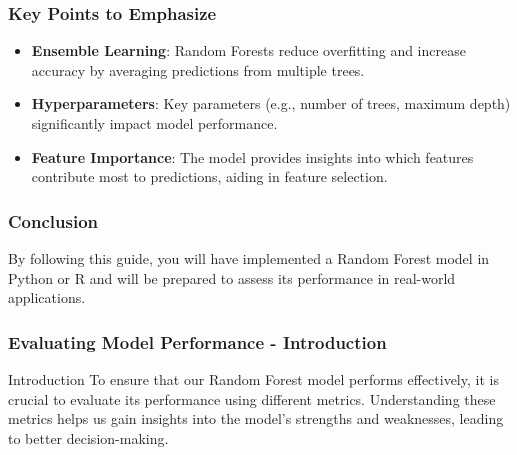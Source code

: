 \documentclass[aspectratio=169]{beamer}
\begin{document}
\begin{frame}
    \frametitle{Key Points to Emphasize}
    \begin{itemize}
        \item \textbf{Ensemble Learning}: Random Forests reduce overfitting and increase accuracy by averaging predictions from multiple trees.
        \item \textbf{Hyperparameters}: Key parameters (e.g., number of trees, maximum depth) significantly impact model performance.
        \item \textbf{Feature Importance}: The model provides insights into which features contribute most to predictions, aiding in feature selection.
    \end{itemize}
\end{frame}

\begin{frame}
    \frametitle{Conclusion}
    By following this guide, you will have implemented a Random Forest model in Python or R and will be prepared to assess its performance in real-world applications.
\end{frame}

\begin{frame}[fragile]
    \frametitle{Evaluating Model Performance - Introduction}
    \begin{block}{Introduction}
        To ensure that our Random Forest model performs effectively, it is crucial to evaluate its performance using different metrics. Understanding these metrics helps us gain insights into the model's strengths and weaknesses, leading to better decision-making.
    \end{block}
\end{frame}
\end{document}
